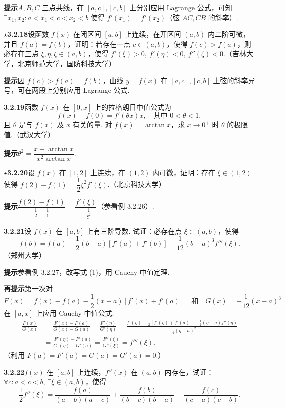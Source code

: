 \documentclass[UTF8, 12pt, fontset=fandol, oneside]{ctexart}
\begin{document}
\noindent\textbf{提示}\quad $A,B,C$ 三点共线，在 $[a,c],[c,b]$ 上分别应用 Lagrange 公式，可知 $\exists x_1,x_2:a<x_1<c<x_2<b$ 使得 $f'(x_1)=f'(x_2)$（弦 $AC,CB$ 的斜率）.

\noindent\textbf{$\star$3.2.18}\quad 设函数 $f(x)$ 在闭区间 $[a,b]$ 上连续，在开区间 $(a,b)$ 内二阶可微，并且 $f(a)=f(b)$，证明：若存在一点 $c\in(a,b)$，使得 $f(c)>f(a)$，则必存在三点 $\xi,\eta,\zeta\in(a,b)$，使得 $f'(\xi)>0,\ f'(\eta)<0,\ f''(\zeta)<0$.（吉林大学，北京师范大学，国防科技大学）

\noindent\textbf{提示}\quad 因 $f(c)>f(a)=f(b)$，曲线 $y=f(x)$ 在 $[a,c],[c,b]$ 上弦的斜率异号，可在两段上分别应用 Lagrange 公式.

\noindent\textbf{3.2.19}\quad 函数 $f(x)$ 在 $[0,x]$ 上的拉格朗日中值公式为
\[
  f(x)-f(0)=f'(\theta x)x,\quad \text{其中 }0<\theta<1,
\]
且 $\theta$ 是与 $f(x)$ 及 $x$ 有关的量. 对 $f(x)=\arctan x$，求 $x\to0^+$ 时 $\theta$ 的极限值.（武汉大学）

\noindent\textbf{提示}\quad $\theta^2=\dfrac{x-\arctan x}{x^2\arctan x}$.

\noindent\textbf{$\star$3.2.20}\quad 设 $f(x)$ 在 $[1,2]$ 上连续，在 $(1,2)$ 内可微，证明：存在 $\xi\in(1,2)$ 使得 $f(2)-f(1)=\dfrac12\xi^2 f'(\xi)$.（北京科技大学）

\noindent\textbf{提示}\quad $\dfrac{f(2)-f(1)}{\frac12-\frac11}=\dfrac{f'(\xi)}{-\frac1{\xi^2}}$（参看例 3.2.26）.

\noindent\textbf{3.2.21}\quad 设 $f(x)$ 在 $[a,b]$ 上有三阶导数. 试证：必存在点 $\xi\in(a,b)$，使得
\[
  f(b)=f(a)+\frac12(b-a)[f'(a)+f'(b)]-\frac1{12}(b-a)^3 f'''(\xi).
\tag{1}
\]
（郑州大学）

\noindent\textbf{提示}\quad 参看例 3.2.27，改写式 (1)，用 Cauchy 中值定理.

\noindent\textbf{再提示}\quad 第一次对
\[
  F(x)=f(x)-f(a)-\frac12(x-a)[f'(x)+f'(a)]
  \quad\text{和}\quad
  G(x)=-\frac1{12}(x-a)^3
\]
在 $[a,x]$ 上应用 Cauchy 中值公式.
\[
\begin{aligned}
\frac{F(x)}{G(x)}
&=\frac{F(x)-F(a)}{G(x)-G(a)}
=\frac{F'(\eta)}{G'(\eta)}
=\frac{f'(\eta)-\frac12[f'(\eta)+f'(a)]-\frac12(\eta-a)f''(\eta)}
{-\frac14(\eta-a)^2}\\
&=\frac{F'(\eta)-F'(a)}{G'(\eta)-G'(a)}
=\frac{F''(\xi)}{G''(\xi)}
=f'''(\xi).
\end{aligned}
\]
（利用 $F(a)=F'(a)=G(a)=G'(a)=0$.）

\noindent\textbf{3.2.22}\quad $f(x)$ 在 $[a,b]$ 上连续，$f''(x)$ 在 $(a,b)$ 内存在，试证：$\forall c:a<c<b,\ \exists \xi\in(a,b)$，使得
\[
  \frac12f''(\xi)=
  \frac{f(a)}{(a-b)(a-c)}
  +\frac{f(b)}{(b-c)(b-a)}
  +\frac{f(c)}{(c-a)(c-b)}.
\tag{1}
\]
\end{document}
